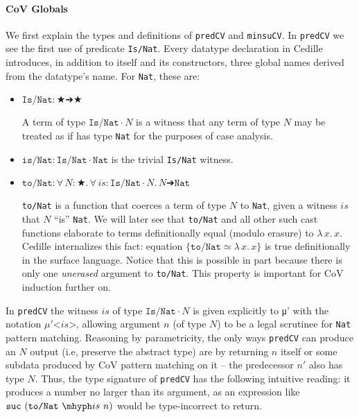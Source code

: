 \documentclass{article}
\newcommand{\abs}[4]{{#1}\, #2\! : \! #3.\, #4}
\newcommand{\absu}[3]{{#1}\, #2.\, #3}
\begin{document}
\paragraph{\textbf{CoV Globals}}
We first explain the types and definitions of \texttt{predCV} and
\texttt{minsuCV}. In \texttt{predCV} we see the first use of predicate
\texttt{Is/Nat}. Every datatype declaration in Cedille introduces, in addition
to itself and its constructors, three global names derived from the datatype's
name. For \texttt{Nat}, these are:

\begin{itemize}
\item \(\texttt{Is/Nat}: ★ ➔ ★\)

  A term of type \(\texttt{Is/Nat} ·N\) is a witness that any term of type
  \(N\) may be treated as if has type \texttt{Nat} for the purposes of
  case analysis.

\item \(\texttt{is/Nat} : \texttt{Is/Nat} · \texttt{Nat}\) is the trivial
\texttt{Is/Nat} witness.
\item \(\texttt{to/Nat}: \abs{∀}{N}{★}{\abs{∀}{is}{\texttt{Is/Nat} ·N}{N ➔
      \texttt{Nat}}}\)

  \texttt{to/Nat} is a function that coerces a term of type $N$ to
  \texttt{Nat}, given a witness $is$ that $N$ ``is'' \texttt{Nat}. We will later
  see that \texttt{to/Nat} and all other such cast functions
  elaborate to terms definitionally equal (modulo erasure) to $\absu{λ}{x}{x}$.
  Cedille internalizes this fact: equation
  \(\{\texttt{to/Nat} ≃ \absu{λ}{x}{x}\}\) is true definitionally in the surface
  language. Notice that
  this is possible in part because there is only one \textit{unerased} argument
  to \texttt{to/Nat}. This property is important for CoV induction further on.
\end{itemize}

In \texttt{predCV} the witness $is$ of type \(\texttt{Is/Nat} ·N\) is given
explicitly to μ' with the notation \(μ'\texttt{<}is\texttt{>}\), allowing
argument $n$ (of type $N$) to be a legal scrutinee for \texttt{Nat} pattern
matching. Reasoning by parametricity, the only ways \texttt{predCV} can produce
an $N$ output (i.e, preserve the abstract type) are by returning
$n$ itself or some subdata produced by CoV pattern matching on it -- the
predecessor $n'$ also has type $N$. Thus, the type signature of \texttt{predCV}
has the following intuitive reading: it produces a number no larger than its
argument, as an expression like \(\texttt{suc}\ (\texttt{to/Nat}\ \mhyph is\
n)\) would be type-incorrect to return.
\end{document}
